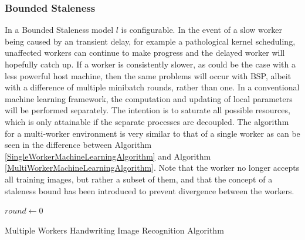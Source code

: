 \documentclass[12pt]{article}
\begin{document}
\subsubsection{Bounded Staleness}
In a Bounded Staleness model $l$ is configurable. In the event of a slow worker being caused by an transient delay, for example a pathological kernel scheduling, unaffected workers can continue to make progress and the delayed worker will hopefully catch up. If a worker is consistently slower, as could be the case with a less powerful host machine, then the same problems will occur with BSP, albeit with a difference of multiple minibatch rounds, rather than one.
\newline
\newline
In a conventional machine learning framework, the computation and updating of local parameters will be performed separately. The intention is to saturate all possible resources, which is only attainable if the separate processes are decoupled.
\newline
\newline
The algorithm for a multi-worker environment is very similar to that of a single worker as can be seen in the difference between Algorithm \ref{SingleWorkerMachineLearningAlgorithm} and Algorithm \ref{MultiWorkerMachineLearningAlgorithm}. Note that the worker no longer accepts all training images, but rather a subset of them, and that the concept of a staleness bound has been introduced to prevent divergence between the workers.

\IncMargin{1em}
\begin{algorithm}[H]
 \BlankLine

 $round \longleftarrow 0$\;
 \caption{Multiple Workers Handwriting Image Recognition Algorithm}
 \label{MultiWorkerMachineLearningAlgorithm}
\end{algorithm}
\DecMargin{1em}
\end{document}
